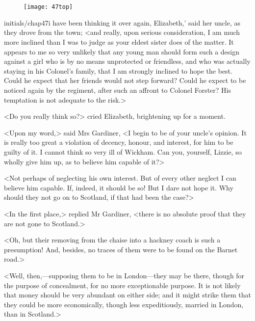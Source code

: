 \chapter[Chapter \thechapter]{}
	
	\begin{figure}[t!]
\centering
\texttt{[image: 47top]}
\end{figure}

\lettrine[lines=6,image=true,ante=`,loversize=.1,findent=2pt]{initials/chap47i}{} have been thinking it over again, Elizabeth,' said her uncle, as they drove from the town; <and really, upon serious consideration, I am much more inclined than I was to judge as your eldest sister does of the matter. It appears to me so very unlikely that any young man should form such a design against a girl who is by no means unprotected or friendless, and who was actually staying in his Colonel's family, that I am strongly inclined to hope the best. Could he expect that her friends would not step forward? Could he expect to be noticed again by the regiment, after such an affront to Colonel Forster? His temptation is not adequate to the risk.>

<Do you really think so?> cried Elizabeth, brightening up for a moment.

<Upon my word,> said Mrs Gardiner, <I begin to be of your uncle's opinion. It is really too great a violation of decency, honour, and interest, for him to be guilty of it. I cannot think so very ill of Wickham. Can you, yourself, Lizzie, so wholly give him up, as to believe him capable of it?>

<Not perhaps of neglecting his own interest. But of every other neglect I can believe him capable. If, indeed, it should be so! But I dare not hope it. Why should they not go on to Scotland, if that had been the case?>

<In the first place,> replied Mr Gardiner, <there is no absolute proof that they are not gone to Scotland.>

<Oh, but their removing from the chaise into a hackney coach is such a presumption! And, besides, no traces of them were to be found on the Barnet road.>

<Well, then,—supposing them to be in London—they may be there, though for the purpose of concealment, for no more exceptionable purpose. It is not likely that money should be very abundant on either side; and it might strike them that they could be more economically, though less expeditiously, married in London, than in Scotland.>

